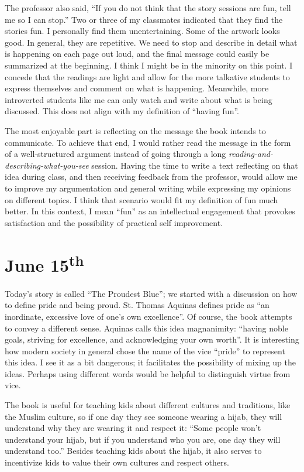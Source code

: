 The professor also said, ``If you do not think that the story sessions are fun, tell me so I can stop.'' Two or three of my classmates indicated that they find the stories fun. I personally find them unentertaining. Some of the artwork looks good. In general, they are repetitive. We need to stop and describe in detail what is happening on each page out loud, and the final message could easily be summarized at the beginning. I think I might be in the minority on this point. I concede that the readings are light and allow for the more talkative students to express themselves and comment on what is happening. Meanwhile, more introverted students like me can only watch and write about what is being discussed. This does not align with my definition of ``having fun''.

The most enjoyable part is reflecting on the message the book intends to communicate. To achieve that end, I would rather read the message in the form of a well-structured argument instead of going through a long \textit{reading-and-describing-what-you-see} session. Having the time to write a text reflecting on that idea during class, and then receiving feedback from the professor, would allow me to improve my argumentation and general writing while expressing my opinions on different topics. I think that scenario would fit my definition of fun much better. In this context, I mean ``fun'' as an intellectual engagement that provokes satisfaction and the possibility of practical self improvement.


\section[June 15]{June 15\textsuperscript{th}}
Today's story is called ``The Proudest Blue''; we started with a discussion on how to define pride and being proud. St. Thomas Aquinas defines pride as ``an inordinate, excessive love of one's own excellence''. Of course, the book attempts to convey a different sense. Aquinas calls this idea magnanimity: ``having noble goals, striving for excellence, and acknowledging your own worth''. It is interesting how modern society in general chose the name of the vice ``pride'' to represent this idea. I see it as a bit dangerous; it facilitates the possibility of mixing up the ideas. Perhaps using different words would be helpful to distinguish virtue from vice.

The book is useful for teaching kids about different cultures and traditions, like the Muslim culture, so if one day they see someone wearing a hijab, they will understand why they are wearing it and respect it: ``Some people won't understand your hijab, but if you understand who you are, one day they will understand too.'' Besides teaching kids about the hijab, it also serves to incentivize kids to value their own cultures and respect others.

